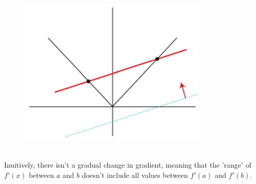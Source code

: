 \documentclass{report}
\begin{document}
\begin{figure}[h]
\includegraphics[width=9cm]{Capture23}\\
\centering
{}
\end{figure}\\
Inuitively, there isn't a gradual change in gradient, meaning
that the 'range' of $f'(x)$ between $a$ and $b$ doesn't include all values
between $f'(a)$ and $f'(b)$.
\newpage
\end{document}
